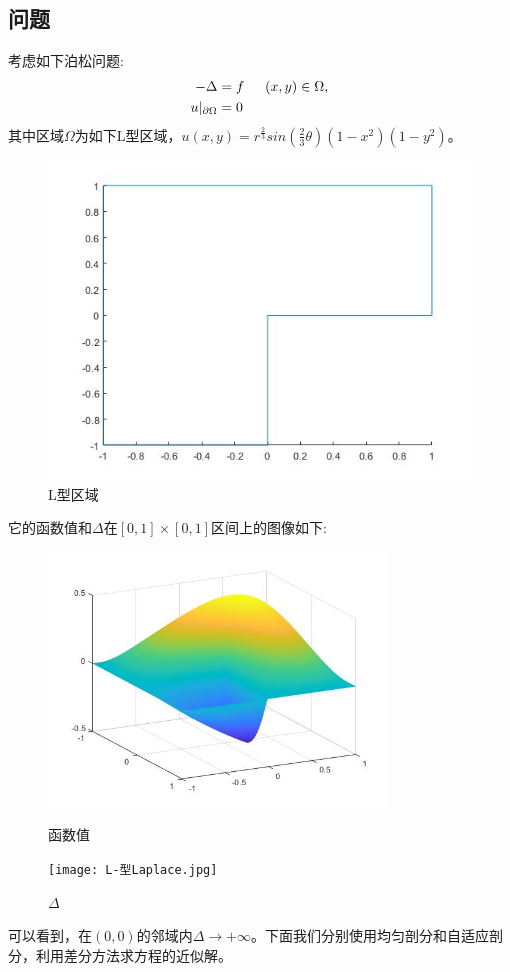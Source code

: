 \documentclass[12pt]{ctexart}
\begin{document}
\subsection{问题}
考虑如下泊松问题:
$$
\begin{aligned}
-\Delta&=f\indent (x,y)\in \Omega,\\
u|_{\partial\Omega}&=0
\end{aligned}
$$
\noindent 其中区域$\Omega$为如下L型区域，$u(x,y)=r^{\frac{2}{3}}sin(\frac{2}{3}\theta)(1-x^2)(1-y^2)$。\\
\begin{figure}[H]
	\centering
	\includegraphics[width=12cm]{L-shaped.jpg}
	\caption{L型区域}
\end{figure}
\noindent 它的函数值和$\Delta$在$[0,1]\times[0,1]$区间上的图像如下:\\
\begin{figure}[H]
	\centering
	\begin{minipage}[t]{0.48\textwidth}
		\centering
		\includegraphics[width=9cm]{L-型函数.jpg}
		\caption{函数值}
	\end{minipage}
	\begin{minipage}[t]{0.48\textwidth}
		\centering
		\texttt{[image: L-型Laplace.jpg]}
		\caption{$\Delta$}
	\end{minipage}
\end{figure}
\noindent 可以看到，在$(0,0)$的邻域内$\Delta\to +\infty$。下面我们分别使用均匀剖分和自适应剖分，利用差分方法求方程的近似解。
\end{document}
